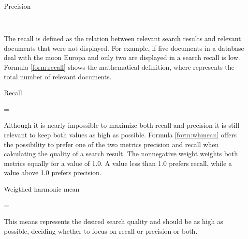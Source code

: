 \begin{mycapequ}[H]
    \caption{Precision}
    \label{form:precision}
    \begin{tcolorbox}
        \symp = \frac{\symn}{\symd}
    \end{tcolorbox}
    \cite[Source:][p. 14]{coles_pro_2009}
\end{mycapequ}
The recall is defined as the relation between relevant search results and relevant documents that were not displayed. For example, if five documents in a database deal with the moon Europa and only two are displayed in a search recall is low. Formula \ref{form:recall} shows the mathematical definition, where \symv represents the total number of relevant documents.
\begin{mycapequ}[H]
    \caption{Recall}
    \label{form:recall}
    \begin{tcolorbox}
        \symr = \frac{\symn}{\symv}
    \end{tcolorbox}
    \cite[Source:][p. 14]{coles_pro_2009}
\end{mycapequ}
Although it is nearly impossible to maximize both recall and precision it is still relevant to keep both values as high as possible. Formula \ref{form:whmean} offers the possibility to prefer one of the two metrics precision and recall when calculating the quality of a search result. The nonnegative weight \symbeta weights both metrics equally for a value of 1.0. A value less than 1.0 prefers recall, while a value above 1.0 prefers precision.
\begin{mycapequ}[H]
    \caption{Weigthed harmonic mean}
    \label{form:whmean}
    \begin{tcolorbox}
        \symFb = 
    \end{tcolorbox}
    \cite[Source:][p. 15]{coles_pro_2009}
\end{mycapequ}
This means \symFb represents the desired search quality and should be as high as possible, deciding whether to focus on recall or precision or both. \parencite[cf.][pp. 13-15]{coles_pro_2009}
